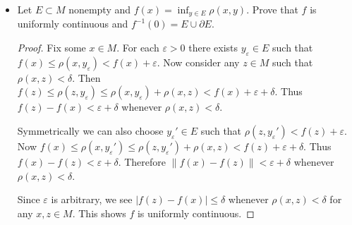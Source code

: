 \begin{itemize}
	\item Let $E \subset M$ nonempty and $f(x) = \operatorname{inf} _{y \in E} \rho(x,y)$. Prove that $f$ is uniformly continuous and $f^{-1} (0) = E \cup \partial E$.
\begin{proof}
	Fix some $x \in M$. For each $\varepsilon>0$ there exists $y_\varepsilon \in E$ such that $f(x) \le  \rho(x,y_\varepsilon) < f(x) + \varepsilon$. Now consider any $z \in M $ such that $\rho(x,z) < \delta$. Then $f(z) \le \rho(z, y_\varepsilon) \le \rho(x,y_\varepsilon) + \rho(x,z) < f(x) + \varepsilon + \delta$. Thus  $f(z) - f(x) < \varepsilon + \delta$ whenever $\rho(x,z)<\delta$. 

	Symmetrically we can also choose $y_\varepsilon' \in E$ such that $\rho(z, y_\varepsilon') < f(z) + \varepsilon$. Now $f(x) \le \rho(x, y_\varepsilon') \le \rho(z, y_\varepsilon') + \rho(x, z) < f(z) + \varepsilon + \delta$. Thus $f(x) - f(z) < \varepsilon + \delta$. Therefore $\|f(x)-f(z)\|<\varepsilon + \delta $ whenever $\rho(x, z) < \delta$.

	Since $\varepsilon$ is arbitrary, we see $\left| f(z) - f(x) \right| \le  \delta$ whenever $\rho(x,z) < \delta$ for any $x, z \in M$. This shows $f$ is uniformly continuous.


\end{proof}
\end{itemize}
